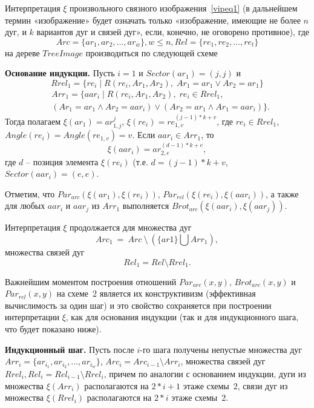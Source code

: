 Интерпретация $\xi$ произвольного связного изображения~\ref{vipeq1} (в дальнейшем термин «изображение» будет означать только «изображение, имеющие не более $n$ дуг, и $k$ вариантов дуг и связей дуг», если, конечно, не оговорено противное), где
\begin{equation}
Arc = \{ar_1, ar_2, ..., ar_w\}, w\le n, Rel=\{re_1, re_2, ..., re_t\}
\label{vipeq5}
\end{equation}
на дереве $TreeImage$ производиться по следующей схеме

\textbf{Основание индукции.} Пусть $i = 1$ и $Sector(ar_1) = (j, j)$ и 
$$Rrel_1 = \{ re_i\;|\;R(re_i, Ar_1 , Ar_2),\;Ar_1 = ar_1 \vee Ar_2 = ar_1 \}$$
\begin{eqnarray*}
&Arr_1 = \{ aar_i\;|\;R (re_i, Ar_1 , Ar_2),\;re_i \in Rrel_1,\nonumber \\ 
&(Ar_1 = ar_1 \wedge Ar_2 = aar_i) \vee (Ar_2 = ar_1 \wedge Ar_1 = aar_i) \}.
\end{eqnarray*}
Тогда полагаем $\xi(ar_1) = ar_{1,j}^j$, $\xi(re_i) = re_{1,v}^{(j-1)*k+v}$, где $re_i \in Rrel_1$, $Angle(re_i) = Angle(re_{1,v}) = v$. 
Если $aar_i \in Arr_1$, то $$\xi(aar_i)=ar_{2,e}^{(d-1)*k+e},$$ где $d$ – позиция элемента $\xi(re_i)$ (т.е. $d =(j-1)*k+v$, $Sector(aar_i) = (e, e)$.

Отметим, что $Par_{arc}(\xi (ar_1), \xi (re_i))$, $Par_{rel}(\xi (re_i), \xi 
(aar_i))$, а также для любых $aar_i$ и $aar_j$ из $Arr_1$ выполняется 
$Brot_{arc}(\xi 
(aar_i), \xi (aar_j))$.

Интерпретация $\xi$ продолжается для множества дуг 
$$Arc_1~=~Arc~\setminus~(\{ ar1\} \bigcup Arr_1),
$$ множества связей дуг $$Rel_1 = Rel \setminus Rrel_1.$$

\begin{remark}
Важнейшим моментом построения отношений 
$Par_{arc}( x, y)$, $Brot_{arc}(x,y)$ и $Par_{rel}( x, y)$
на схеме~2 является их конструктивизм (эффективная вычислимость за один шаг) и 
это свойство сохраняется при построении интерпретации $\xi$, как для основания 
индукции (так и для индукционного шага, что будет показано ниже). 
\end{remark}

\textbf{Индукционный шаг.} Пусть после $i$-го шага получены непустые множества дуг $Arr_i = \{ ar_{i_1}, ar_{i_2}, ..., ar_{i_w} \} $, $Arc_i = Arc_{i-1} \setminus Arr_i$, множества связей дуг $Rrel_i , Rel_i = Rel_{i-1} \setminus Rrel_i$, причем по аналогии с основанием индукции, дуги из множества 
$\xi(Arr_i)$ располагаются на $2 * i + 1$ этаже схемы~2, связи дуг из множества $\xi(Rrel_i)$ располагаются на $2 * i$ этаже схемы~2.

